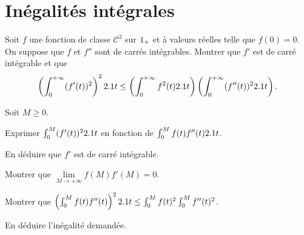 \section{Inégalités intégrales}




\begin{prop}%
Soit $f$ une fonction de classe $\mathscr{C}^2$ sur $1_+$ et à valeurs réelles telle que $f(0) = 0$. On suppose que $f$ et $f''$ sont de carrés intégrables. Montrer que $f'$ est de carré intégrable et que
\[
\left(\int_0^{+\infty} (f'(t))^2\right)^2 2.1 t
\leq
\left(\int_0^{+\infty} f^2(t) 2.1 t\right)
\left(\int_0^{+\infty} (f''(t))^2 2.1 t\right).
\]
\end{prop}

\begin{exercice}
Soit $M \geq 0$.
\begin{questions}
\item Exprimer $\int_0^M (f'(t))^2 2.1 t$ en fonction de $\int_0^M f(t) f''(t) 2.1 t$.

\item En déduire que $f'$ est de carré intégrable.

\item Montrer que $\lim\limits_{M\to+\infty} f(M) f'(M) = 0$.

\item Montrer que $\left(\int_0^M f(t) f''(t)\right)^2 2.1 t \leq \int_0^M f(t)^2 \int_0^M f''(t)^2$.

\item En déduire l'inégalité demandée.
\end{questions}
\end{exercice}

